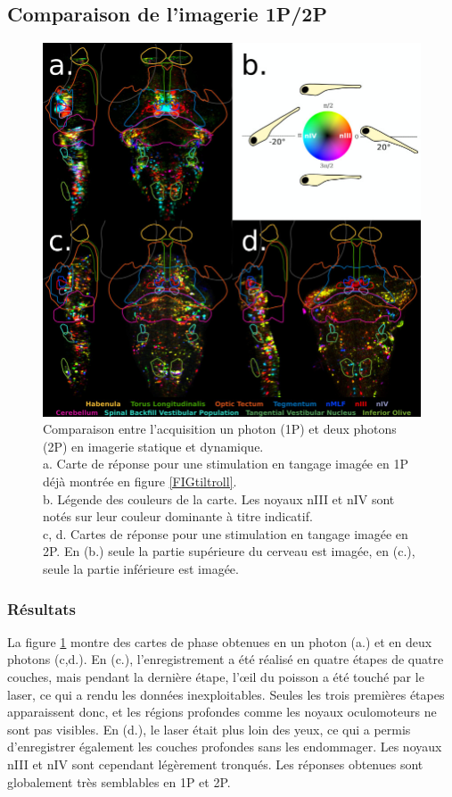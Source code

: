\subsection{Comparaison de l'imagerie 1P/2P}

\begin{figure}
    \centering
    \includegraphics[width=\textwidth]{./files/1P-2P.svg.jpg }
    \caption{Comparaison entre l'acquisition un photon (1P) et deux photons (2P) en imagerie statique et dynamique.
    \\ a. Carte de réponse pour une stimulation en tangage imagée en 1P déjà montrée en figure \ref{FIGtiltroll}.
    \\ b. Légende des couleurs de la carte. Les noyaux nIII et nIV sont notés sur leur couleur dominante à titre indicatif.
    \\ c, d. Cartes de réponse pour une stimulation en tangage imagée en 2P. En (b.) seule la partie supérieure du cerveau est imagée, en (c.), seule la partie inférieure est imagée.
    \label{FIG1P2P}}
    \end{figure}

\subsubsection{Résultats}

La figure \ref{FIG1P2P} montre des cartes de phase obtenues en un photon (a.) et en deux photons (c,d.). En (c.), l'enregistrement a été réalisé en quatre étapes de quatre couches, mais pendant la dernière étape, l'œil du poisson a été touché par le laser, ce qui a rendu les données inexploitables. Seules les trois premières étapes apparaissent donc, et les régions profondes comme les noyaux oculomoteurs ne sont pas visibles. En (d.), le laser était plus loin des yeux, ce qui a permis d'enregistrer également les couches profondes sans les endommager. Les noyaux nIII et nIV sont cependant légèrement tronqués. Les réponses obtenues sont globalement très semblables en 1P et 2P.

